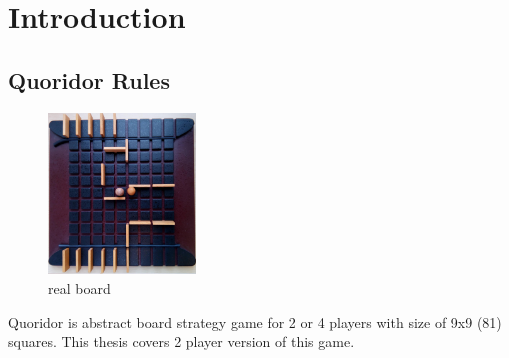 \documentclass[12pt, oneside]{book}
\author{\mfauthor}
\title{\thesisname}
\date{\mfyear}
\begin{document}
  
  \newpage

  
  \newpage



  \section{Introduction}
    \subsection{Quoridor Rules}

    \begin{figure}
      \vspace*{-0.48cm}
      \centering
      \includegraphics[width=0.35\textwidth]{real_board.jpg}
      \vspace*{-0.60cm}
      \caption{real board}
      \label{fig:real_board}
      \vspace*{-0.60cm}
    \end{figure}

    Quoridor is abstract board strategy game for 2 or 4 players with size of
    9x9 (81) squares. This thesis covers 2 player version of this game.
\end{document}
